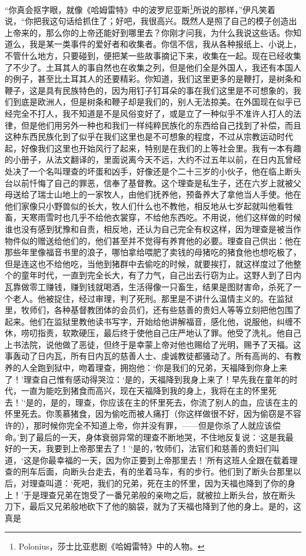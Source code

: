 \par “你真会抠字眼，就像《哈姆雷特》中的波罗尼亚斯\footnote{Polonius，莎士比亚悲剧《哈姆雷特》中的人物。}所说的那样，”伊凡笑着说，“你把我这句话给抓住了；好吧，我很高兴。既然人是照了自己的模子创造出上帝来的，那么你的上帝还能好到哪里去？你刚才问我，为什么我说这些话。你知道么，我是某一类事件的爱好者和收集者。你信不信，我从各种报纸上、小说上，不管什么地方，只要碰到，便把某一些故事摘记下来，收集在一起。现在已经收集了不少了。土耳其人的事自然也在收集之列，但是他们全是外国人，我还有本国人的例子，甚至比土耳其人的还要精彩。你知道，我们这里更多的是鞭打，是树条和鞭子，这是具有民族特色的，因为用钉子钉耳朵的事在我们这里是不可想象的，我们到底是欧洲人，但是树条和鞭子却是我们的，别人无法掠美。在外国现在似乎已经完全不打人，我不知道是不是风俗变好了，或是立了一种似乎不准许人打人的法律，但是他们用另外一种也和我们一样纯粹民族化的东西给自己找到了补偿，而且这种东西民族化到了似乎在我们这里也是不可想象的程度，不过从宗教运动时代起，好像我们这里也开始风行了起来，特别是在我们的上等社会里。我有一本有趣的小册子，从法文翻译的，里面说离今天不远，大约不过五年以前，在日内瓦曾经处决了一个名叫理查的坏蛋和凶手，好像还是个二十三岁的小伙子，他在临上断头台以前忏悔了自己的罪恶，信奉了基督教。这个理查是私生子，还在六岁上就被父母送给了瑞士山地上的一家牧人，由他们抚养他，预备养大了拿他当人手使。他在他们家像只小野兽似的长大，牧人们什么也不教他，相反地从七岁起就叫他看牲畜，天寒雨雪时也几乎不给他衣裳穿，不给他东西吃。不用说，他们这样做的时候谁也没有感到犹豫和自责，相反地，还认为自己完全有权这样，因为理查是被当作物件似的赠送给他们的，他们甚至并不觉得有养育他的必要。理查自己供出：他在那些年里像福音书里的浪子，哪怕拿给喂肥了卖钱的母猪吃的猪食他也想吃极了，但是连这也不给他吃，当他到猪群中去偷吃的时候，就要挨打，就这样度过了他整个的童年时代，一直到完全长大，有了力气，自己出去行窃为止。这野人到了日内瓦靠做零工赚钱，赚到钱就喝酒，生活得像一只畜生，结果是图财害命，杀死了一个老人。他被捉住，经过审理，判了死刑。那里是不讲什么温情主义的。在监狱里，牧师们，各种基督教团体的会员们，还有些慈善的贵妇人等等立刻把他包围了起来。他们在监狱里教他读书写字，开始给他讲解福音，感化他，说服他，纠缠不休，唠叨指责，软欺硬压，最后终于使他自己庄严地认了罪。他受了洗礼。他自己上书法院，说他做了恶徒，但终于是幸蒙上帝对他也赐给了光明，赐予了天福。这事轰动了日内瓦，所有日内瓦的慈善人士、虔诚教徒都骚动了。所有高尚的、有教养的人全跑到狱中，吻着理查，拥抱他：‘你是我们的兄弟，天福降到你身上来了！’理查自己惟有感动得哭泣：‘是的，天福降到我身上来了！早先我在童年的时代，一直为能吃到猪食而高兴，现在天福降到我的身上，我将在主的怀里死去！’‘是的，是的，理查，你应该在主的怀里死去，你流了别人的血，应该在主的怀里死去。你羡慕猪食，因为偷吃而被人痛打（你这样做很不好，因为偷窃是不容许的），那时候你完全不知道上帝，你并没有罪，——但是你杀了人就应该偿命。’到了最后的一天，身体衰弱异常的理查不断地哭，不住地反复说：‘这是我最好的一天，我要到上帝那里去了！’‘是的，’牧师们，法官们和慈善的贵妇们叫道，‘这是你最幸福的一天，因为你正要到上帝那里去！’所有这班人全跟在载着理查的刑车后面，向断头台走去，有的坐着马车，有的步行。他们到了断头台那里以后，对理查叫道：‘死吧，我们的兄弟，死在主的怀里，因为天福也降到了你的身上！’于是理查兄弟在饱受了一番兄弟般的亲吻之后，就被拉上断头台，放在断头刀下，最后又兄弟般地砍下了他的脑袋，就为了天福也降到了他的身上。是的，这真是